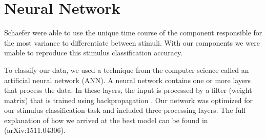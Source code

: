 \chapter{Neural Network}
Schaefer \etal \citeyear{schaefer_name_2011} were able to use the unique time course of the component responsible for the most variance to differentiate between stimuli.
With our components we were unable to reproduce this stimulus classification accuracy. 
 
To classify our data, we used a technique from the computer science called an artificial neural network (\ac{ANN}).
A neural network contains one or more layers that process the data.
In these layers, the input is processed by a filter (weight matrix) that is trained using backpropagation \cite{Rumelhart_backpropagation_1986}. 
Our network was optimized for our stimulus classification task and included three processing layers.
The full explanation of how we arrived at the best model can be found in \cite{stober_ICLR2016} (arXiv:1511.04306).

